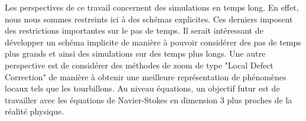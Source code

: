 Les perspectives de ce travail concernent des simulations en temps long. En effet, nous nous sommes restreints ici à des schémas explicites. Ces derniers imposent des restrictions importantes sur le pas de temps. Il serait intéressant de développer un schéma implicite de manière à pouvoir considérer des pas de temps plus grands et ainsi des simulations sur des temps plus longs. Une autre perspective est de considérer des méthodes de zoom de type "Local Defect Correction" de manière à obtenir une meilleure représentation de phénomènes locaux tels que les tourbillons. Au niveau équations, un objectif futur est de travailler avec les équations de Navier-Stokes en dimension 3 plus proches de la réalité physique.

